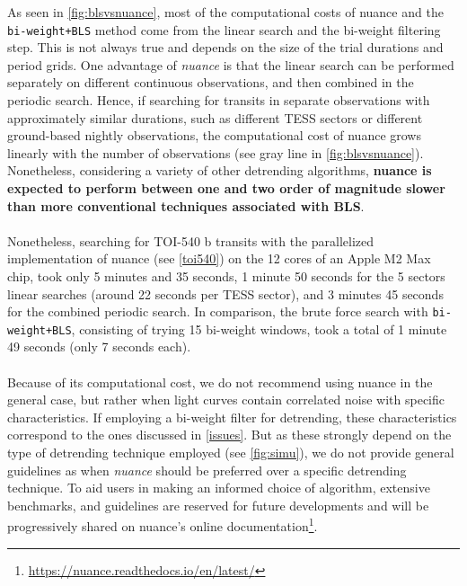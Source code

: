 \documentclass[modern,linenumbers]{aastex631}
\newcommand{\nuancemethod}{\textit{nuance}}
\newcommand{\nuancecode}{\textsf{nuance}}
\newcommand{\footlink}[1]{\footnote{\url{#1}}}
\begin{document}
As seen in \autoref{fig:blsvsnuance}, most of the computational costs of \nuancecode{} and the \texttt{bi-weight+BLS} method come from the linear search and the bi-weight filtering step. This is not always true and depends on the size of the trial durations and period grids. One advantage of \nuancemethod{} is that the linear search can be performed separately on different continuous observations, and then combined in the periodic search. Hence, if searching for transits in separate observations with approximately similar durations, such as different TESS sectors or different ground-based nightly observations, the computational cost of \nuancecode{} grows linearly with the number of observations (see gray line in \autoref{fig:blsvsnuance}). Nonetheless, considering a variety of other detrending algorithms, \textbf{\nuancecode{} is expected to perform between one and two order of magnitude slower than more conventional techniques associated with BLS}.\\\\ 
Nonetheless, searching for TOI-540 b transits with the parallelized implementation of \nuancecode{} (see \autoref{toi540}) on the 12 cores of an Apple M2 Max chip, took only 5 minutes and 35 seconds, 1 minute 50 seconds for the 5 sectors linear searches (around 22 seconds per TESS sector), and 3 minutes 45 seconds for the combined periodic search. In comparison, the brute force search with \texttt{bi-weight+BLS}, consisting of trying 15 bi-weight windows, took a total of 1 minute 49 seconds (only 7 seconds each).\\\\
Because of its computational cost, we do not recommend using \nuancecode{} in the general case, but rather when light curves contain correlated noise with specific characteristics. If employing a bi-weight filter for detrending, these characteristics correspond to the ones discussed in \autoref{issues}. But as these strongly depend on the type of detrending technique employed (see \autoref{fig:simu}), we do not provide general guidelines as when \nuancemethod{} should be preferred over a specific detrending technique. To aid users in making an informed choice of algorithm, extensive benchmarks, and guidelines are reserved for future developments and will be progressively shared on \nuancecode{}'s online documentation\footlink{https://nuance.readthedocs.io/en/latest/}.
\end{document}
